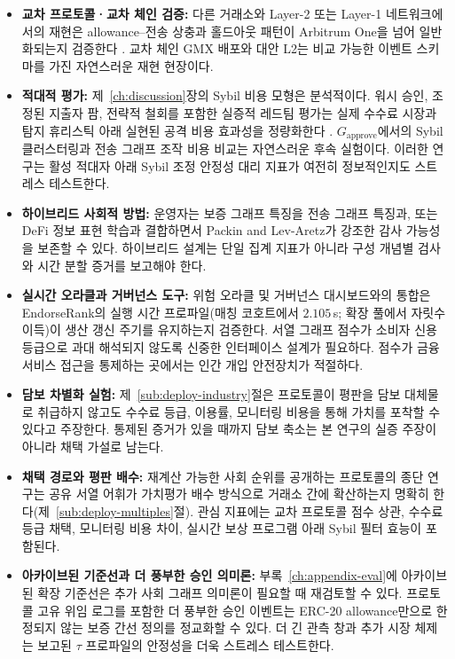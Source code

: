 \begin{itemize}
\item \textbf{교차 프로토콜·교차 체인 검증:} 다른 거래소와 Layer-2 또는 Layer-1 네트워크에서의 재현은 allowance--전송 상충과 홀드아웃 패턴이 Arbitrum One을 넘어 일반화되는지 검증한다 . 교차 체인 GMX 배포와 대안 L2는 비교 가능한 이벤트 스키마를 가진 자연스러운 재현 현장이다.

\item \textbf{적대적 평가:} 제~\ref{ch:discussion}장의 Sybil 비용 모형은 분석적이다. 워시 승인, 조정된 지출자 팜, 전략적 철회를 포함한 실증적 레드팀 평가는 실제 수수료 시장과 탐지 휴리스틱 아래 실현된 공격 비용 효과성을 정량화한다 . $G_{\text{approve}}$에서의 Sybil 클러스터링과 전송 그래프 조작 비용 비교는 자연스러운 후속 실험이다. 이러한 연구는 활성 적대자 아래 Sybil 조정 안정성 대리 지표가 여전히 정보적인지도 스트레스 테스트한다.

\item \textbf{하이브리드 사회적 방법:} 운영자는 보증 그래프 특징을 전송 그래프 특징과, 또는 DeFi 정보 표현 학습과  결합하면서 Packin and Lev-Aretz가 강조한 감사 가능성을 보존할 수 있다. 하이브리드 설계는 단일 집계 지표가 아니라 구성 개념별 검사와 시간 분할 증거를 보고해야 한다.

\item \textbf{실시간 오라클과 거버넌스 도구:} 위험 오라클 및 거버넌스 대시보드와의 통합은 EndorseRank의 실행 시간 프로파일(매칭 코호트에서 $2.105$\,s; 확장 풀에서 자릿수 이득)이 생산 갱신 주기를 유지하는지 검증한다. 서열 그래프 점수가 소비자 신용 등급으로 과대 해석되지 않도록 신중한 인터페이스 설계가 필요하다. 점수가 금융 서비스 접근을 통제하는 곳에서는 인간 개입 안전장치가 적절하다.

\item \textbf{담보 차별화 실험:} 제~\ref{sub:deploy-industry}절은 프로토콜이 평판을 담보 대체물로 취급하지 않고도 수수료 등급, 이용률, 모니터링 비용을 통해 가치를 포착할 수 있다고 주장한다. 통제된 증거가 있을 때까지 담보 축소는 본 연구의 실증 주장이 아니라 채택 가설로 남는다.

\item \textbf{채택 경로와 평판 배수:} 재계산 가능한 사회 순위를 공개하는 프로토콜의 종단 연구는 공유 서열 어휘가 가치평가 배수 방식으로 거래소 간에 확산하는지 명확히 한다(제~\ref{sub:deploy-multiples}절). 관심 지표에는 교차 프로토콜 점수 상관, 수수료 등급 채택, 모니터링 비용 차이, 실시간 보상 프로그램 아래 Sybil 필터 효능이 포함된다.

\item \textbf{아카이브된 기준선과 더 풍부한 승인 의미론:} 부록~\ref{ch:appendix-eval}에 아카이브된 확장 기준선은 추가 사회 그래프 의미론이 필요할 때 재검토할 수 있다. 프로토콜 고유 위임 로그를 포함한 더 풍부한 승인 이벤트는 ERC-20 allowance만으로 한정되지 않는 보증 간선 정의를 정교화할 수 있다. 더 긴 관측 창과 추가 시장 체제는 보고된 $\tau$ 프로파일의 안정성을 더욱 스트레스 테스트한다.
\end{itemize}

